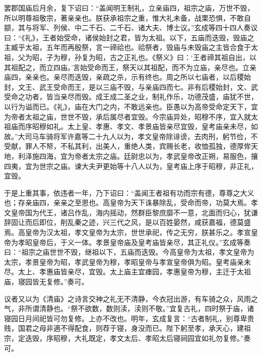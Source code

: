 \documentclass[12pt,UTF8]{ctexbook}
\begin{document}
罢郡国庙后月余，复下诏曰：“盖闻明王制礼，立亲庙四，祖宗之庙，万世不毁，所以明尊祖敬宗，著亲亲也。朕获承祖宗之重，惟大礼未备，战栗恐惧，不敢自颛，其与将军、列侯、中二千石、二千石、诸大夫、博士议。”玄成等四十四人奏议曰：“《礼》，王者始受命，诸侯始封之君，皆为太祖。以下，五庙而迭毁，毁庙之主臧乎太祖，五年而再殷祭，言一禘祫也。祫祭者，毁庙与未毁庙之主皆合食于太祖，父为昭，子为穆，孙复为昭，古之正礼也。《祭义》曰：‘王者禘其祖自出，以其祖配之，而立四庙。’言始受命而王，祭天以其祖配，而不为立庙，亲尽也。立亲庙四，亲亲也。亲尽而迭毁，亲疏之杀，示有终也。周之所以七庙者，以后稷始封，文王、武王受命而王，是以三庙不毁，与亲庙四而七。非有后稷始封，文、武受命之功者，皆当亲尽而毁。成王成二圣之业，制礼作乐，功德茂盛，庙犹不世，以行为谥而已。《礼》，庙在大门之内，不敢远亲也。臣愚以为高帝受命定天下，宜为帝者太祖之庙，世世不毁，承后属尽者宜毁。今宗庙异处，昭穆不序，宜入就太祖庙而序昭穆如礼。太上皇、孝惠、孝文、孝景庙皆亲尽宜毁，皇考庙亲未尽，如故。”大司马车骑将军许嘉等二十九人以为，孝文皇帝除诽谤，去肉刑，躬节俭，不受献，罪人不帑，不私其利，出美人，重绝人类，宾赐长老，收恤孤独，德厚侔天地，利泽施四海，宜为帝者太宗之庙。廷尉忠以为，孝武皇帝改正朔，易服色，攘四夷，宜为世宗之庙。谏大夫尹更始等十八人以为，皇考庙上序于昭穆，非正礼，宜毁。



于是上重其事，依违者一年，乃下诏曰：“盖闻王者祖有功而宗有德，尊尊之大义也；存亲庙四，亲亲之至恩也。高皇帝为天下诛暴除乱，受命而帝，功莫大焉。孝文皇帝国为代王，诸吕作乱，海内摇动，然群臣黎庶靡不一意，北面而归心，犹谦辞固让而后即位，削乱秦之迹，兴三代之风，是以百姓晏然，咸获嘉福，德莫盛焉。高皇帝为汉太祖，孝文皇帝为太宗，世世承祀，传之无穷，朕甚乐之。孝宣皇帝为孝昭皇帝后，于义一体。孝景皇帝庙及皇考庙皆亲尽，其正礼仪。”玄成等奏曰：“祖宗之庙世世不毁，继祖以下，五庙而迭毁。今高皇帝为太祖，孝文皇帝为太宗，孝景皇帝为昭，孝武皇帝为穆，孝昭皇帝与孝宣皇帝俱为昭。皇考庙亲未尽。太上、孝惠庙皆亲尽，宜毁。太上庙主宜瘗园，孝惠皇帝为穆，主迁于太祖庙，寝园皆无复修。”奏可。



议者又以为《清庙》之诗言交神之礼无不清静，今衣冠出游，有车骑之众，风雨之气，非所谓清静也。“祭不欲数，数则渎，渎则不敬。”宜复古礼，四时祭于庙，诸寝园日月间祀皆可勿复修。上亦不改也。明年，玄成复言：“古者制礼，别尊卑贵贱，国君之母非適不得配食，则荐于寝，身没而已。陛下躬至孝，承天心，建祖宗，定迭毁，序昭穆，大礼既定，孝文太后、孝昭太后寝祠园宜如礼勿复修。”奏可。
\end{document}
